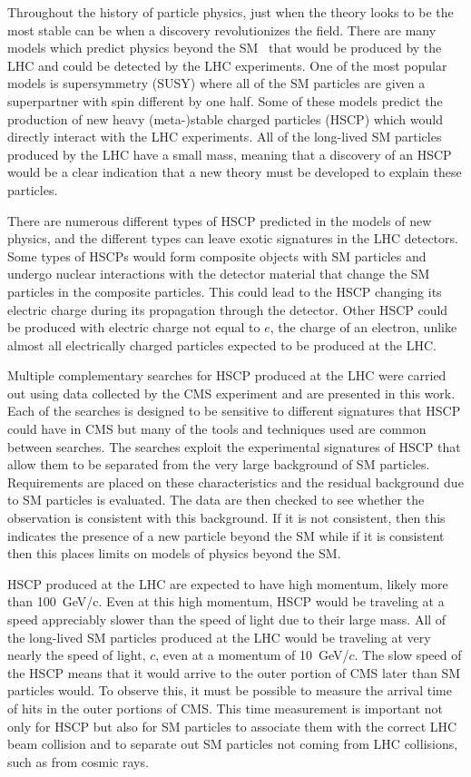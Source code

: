 Throughout the history of particle physics, just when the theory looks to be the most stable can be when a discovery revolutionizes the field.
There are many models which predict physics beyond the SM~\cite{Martin:1997ns, Tata:1997uf} 
that would be produced by the LHC and could be detected by the LHC experiments.
One of the most popular models is supersymmetry (SUSY) where all of the SM particles are given a superpartner with spin different by one half.
Some of these models predict the production of new heavy (meta-)stable charged particles (HSCP) 
which would directly interact with the LHC experiments. All of the long-lived SM particles produced by the LHC have a small mass, meaning that a discovery of an HSCP
would be a clear indication that a new theory must be developed to explain these particles.

There are numerous different types of HSCP predicted in the models of new physics, and the different types can leave exotic signatures in the LHC detectors.
Some types of HSCPs would form composite objects with SM particles and undergo nuclear interactions with the detector material
that change the SM particles in the composite particles. This could lead to the HSCP changing its electric charge during its propagation through the detector.
Other HSCP could be produced with electric charge not equal to $e$, the charge of an electron, unlike almost all electrically charged particles 
expected to be produced at the LHC.

Multiple complementary searches for HSCP produced at the LHC were carried out using data collected by the CMS experiment and are presented in this work.
Each of the searches is designed to be sensitive to different signatures that HSCP could have in CMS but many of the tools and techniques used are
common between searches. The searches exploit the experimental signatures of HSCP that allow them to be separated from the very large background of SM particles.
Requirements are placed on these characteristics and the residual background due to SM particles is evaluated. The data are then checked to see whether
the observation is consistent with this background. If it is not consistent, then this indicates the presence of a new particle beyond the SM while if it
is consistent then this places limits on models of physics beyond the SM.

HSCP produced at the LHC are expected to have high momentum, likely more than 100~GeV/c. Even at this high momentum, HSCP would be traveling at a speed
appreciably slower than the speed of light due to their large mass. All of the long-lived SM particles produced at the LHC would be traveling at very nearly
the speed of light, $c$, even at a momentum of 10~GeV/$c$.
The slow speed of the HSCP means that it would arrive to the outer portion of CMS later than SM particles would.
To observe this, it must be possible to measure the arrival time of hits in the outer portions of CMS. This time measurement is important not only
for HSCP but also for SM particles to associate them with the correct LHC beam collision and to separate out SM particles not coming from
LHC collisions, such as from cosmic rays.

